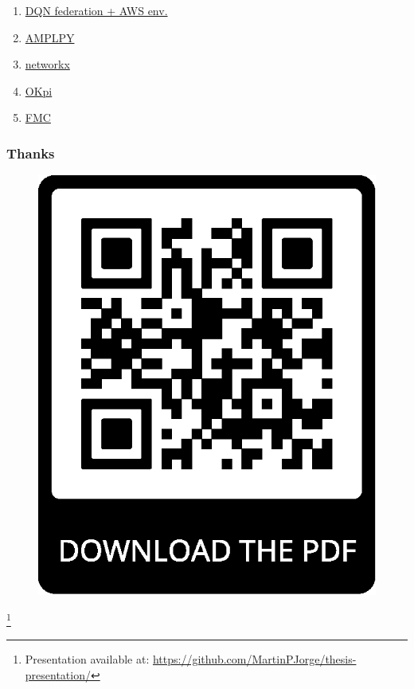 \documentclass[aspectratio=169]{beamer}
\begin{document}
\begin{frame}
\begin{minipage}{.45\textwidth}
\begin{enumerate}
            \item {\color{uc3mblue}\href{ https://github.com/MartinPJorge/5gt-federation/tree/extensionICC/utils/aws/}{DQN federation + AWS env.}}
            \item {\color{uc3mblue}\href{https://github.com/ampl/amplpy/pull/24}{AMPLPY}}
            \item {\color{uc3mblue}\href{https://github.com/networkx/networkx/pull/3358}{networkx}}
            \item {\color{uc3mblue}\href{https://github.com/MartinPJorge/placement}{OKpi}}
            \item {\color{uc3mblue}\href{https://github.com/MartinPJorge/placement}{FMC}}
        \end{enumerate}
    \end{minipage}
\end{frame}








\begin{frame}
    \frametitle{Thanks}


    \begin{figure}
        \centering
        \includegraphics[width=.25\textwidth]{qr.eps}
    \end{figure}

    {\let\thefootnote\relax\footnote{{Presentation available at: \url{https://github.com/MartinPJorge/thesis-presentation/}
    }}}
\end{frame}
\end{document}
